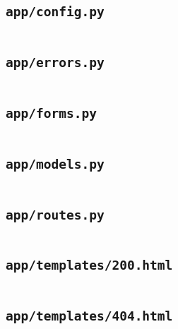\subsection{\texttt{app/config.py}}
\begin{codelisting}
\inputminted[breakanywhere]{python3}{../uswacs-2-iy2d502-salapp/app/config.py}\end{codelisting}
\subsection{\texttt{app/errors.py}}
\begin{codelisting}
\inputminted[breakanywhere]{python3}{../uswacs-2-iy2d502-salapp/app/errors.py}\end{codelisting}
\subsection{\texttt{app/forms.py}}
\begin{codelisting}
\inputminted[breakanywhere]{python3}{../uswacs-2-iy2d502-salapp/app/forms.py}\end{codelisting}
\subsection{\texttt{app/models.py}}
\begin{codelisting}
\inputminted[breakanywhere]{python3}{../uswacs-2-iy2d502-salapp/app/models.py}\end{codelisting}
\subsection{\texttt{app/routes.py}}
\begin{codelisting}
\inputminted[breakanywhere]{python3}{../uswacs-2-iy2d502-salapp/app/routes.py}\end{codelisting}
\subsection{\texttt{app/templates/200.html}}
\begin{codelisting}
\inputminted[breakanywhere]{html+jinja}{../uswacs-2-iy2d502-salapp/app/templates/200.html}\end{codelisting}
\subsection{\texttt{app/templates/404.html}}
\begin{codelisting}
\inputminted[breakanywhere]{html+jinja}{../uswacs-2-iy2d502-salapp/app/templates/404.html}\end{codelisting}
